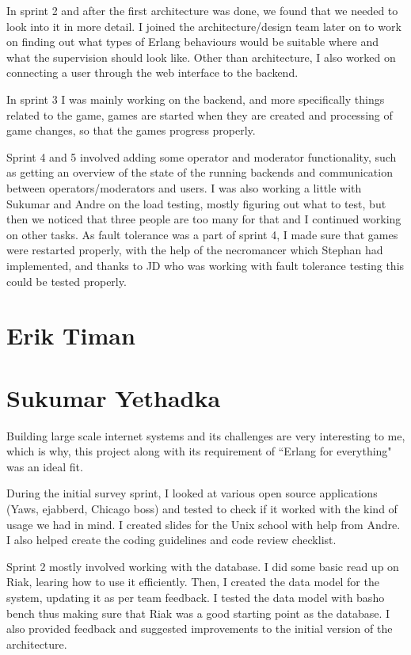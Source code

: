 \documentclass[11pt,a4paper]{report}
\begin{document}
In sprint 2 and after the first architecture was done, we found that we
needed to look into it in more detail. I joined the architecture/design team
later on to work on finding out what types of Erlang behaviours would be
suitable where and what the supervision should look like. Other than
architecture, I also worked on connecting a user through the web interface to
the backend.

In sprint 3 I was mainly working on the backend, and more specifically things
related to the game, games are started when they are created and processing of
game changes, so that the games progress properly.

Sprint 4 and 5 involved adding some operator and moderator functionality, such
as getting an overview of the state of the running backends and communication
between operators/moderators and users. I was also working a little with Sukumar
and Andre on the load testing, mostly figuring out what to test, but then we
noticed that three people are too many for that and I continued working on other
tasks.
As fault tolerance was a part of sprint 4, I made sure that games were restarted
properly, with the help of the necromancer which Stephan had implemented, and
thanks to JD who was working with fault tolerance testing this could be tested
properly.
\section{Erik Timan}
\section{Sukumar Yethadka}
Building large scale internet systems and its challenges are very interesting to me, which is why, this project along with its requirement of ``Erlang for everything" was an ideal fit.

During the initial survey sprint, I looked at various open source applications (Yaws, ejabberd, Chicago boss) and tested to check if it worked with the kind of usage we had in mind. I created slides for the Unix school with help from Andre. I also helped create the coding guidelines and code review checklist.

Sprint 2 mostly involved working with the database. I did some basic read up on Riak, learing how to use it efficiently. Then, I created the data model for the system, updating it as per team feedback. I tested the data model with basho bench thus making sure that Riak was a good starting point as the database. I also provided feedback and suggested improvements to the initial version of the architecture.
\end{document}
